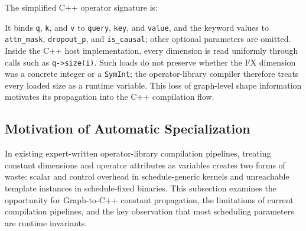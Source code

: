 {\color{red}%
\par}
{\color{blue}
\begin{example}
\label{ex:sdpa-signature}
The simplified C++ operator signature is:
\par
\noindent{}
\par
\end{example}
}
{\color{blue}%
It binds \texttt{q}, \texttt{k}, and \texttt{v} to \texttt{query}, \texttt{key}, and \texttt{value}, and the keyword values to \texttt{attn\_mask}, \texttt{dropout\_p}, and \texttt{is\_causal}; other optional parameters are omitted. Inside the C++ host implementation, every dimension is read uniformly through calls such as \texttt{q->size(i)}. Such loads do not preserve whether the FX dimension was a concrete integer or a \texttt{SymInt}; the operator-library compiler therefore treats every loaded size as a runtime variable. This loss of graph-level shape information motivates its propagation into the C++ compilation flow.
\par}

\subsection{Motivation of Automatic  Specialization}
\label{sec:motivation:auto-spec}

{\color{red}%
\mbox{\cite{liao2019davinci}}\hspace{0pt}
\par}
{\color{blue}%
In existing expert-written operator-library compilation pipelines, treating constant dimensions and operator attributes as variables creates two forms of waste: scalar and control overhead in schedule-generic kernels and unreachable template instances in schedule-fixed binaries. This subsection examines the opportunity for Graph-to-C++ constant propagation, the limitations of current compilation pipelines, and the key observation that most scheduling parameters are runtime invariants.
\par}

